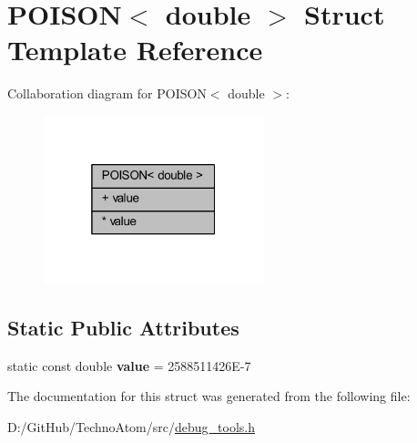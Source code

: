\hypertarget{struct_p_o_i_s_o_n_3_01double_01_4}{}\section{P\+O\+I\+S\+ON$<$ double $>$ Struct Template Reference}
\label{struct_p_o_i_s_o_n_3_01double_01_4}


Collaboration diagram for P\+O\+I\+S\+ON$<$ double $>$\+:
\nopagebreak
\begin{figure}[H]
\begin{center}
\leavevmode
\includegraphics[width=181pt]{struct_p_o_i_s_o_n_3_01double_01_4__coll__graph}
\end{center}
\end{figure}
\subsection*{Static Public Attributes}
\textbf{ }\par
\begin{DoxyCompactItemize}
\item 
\mbox{\label{struct_p_o_i_s_o_n_3_01double_01_4_aa06e0aac29e46b6fc449dfddad0bba91}} 
static const double {\bfseries value} = 2588511426\+E-\/7
\end{DoxyCompactItemize}



The documentation for this struct was generated from the following file\+:\begin{DoxyCompactItemize}
\item 
D\+:/\+Git\+Hub/\+Techno\+Atom/src/\hyperlink{debug__tools_8h}{debug\+\_\+tools.\+h}\end{DoxyCompactItemize}
